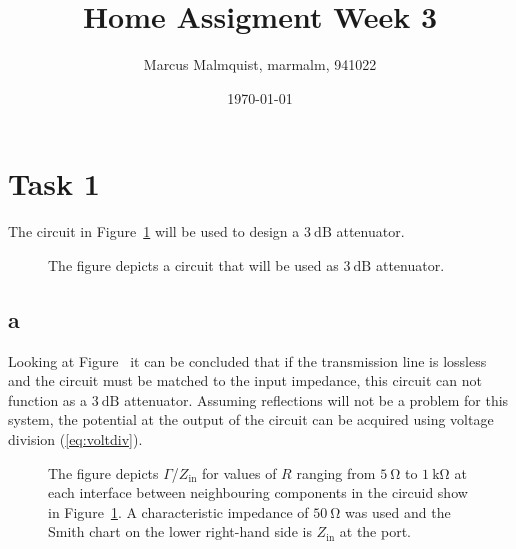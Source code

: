 \documentclass{article}
\title{Home Assigment Week 3}
\author{Marcus Malmquist, marmalm, 941022}
\date{\today}
\begin{document}
\maketitle

\section{Task 1}\label{sec:1}
The circuit in Figure~\ref{fig:circ} will be used to design a $\SI{3}{\deci\bel}$ attenuator.
\begin{figure}
  \centering
  \noindent\makebox[\textwidth]{\scalebox{0.9}{}}
  \caption{The figure depicts a circuit that will be used as $\SI{3}{\deci\bel}$ attenuator.}
  \label{fig:circ}
\end{figure}

\subsection{a}\label{sec:1a}
Looking at Figure~\label{fig:smith} it can be concluded that if the transmission line is lossless and the circuit must be matched to the input impedance, this circuit can not function as a $\SI{3}{\deci\bel}$ attenuator. Assuming reflections will not be a problem for this system, the potential at the output of the circuit can be acquired using voltage division (\ref{eq:voltdiv}).
\begin{figure}
  \centering
  \noindent{}
  \caption{The figure depicts $\Gamma$/$Z_\text{in}$ for values of $R$ ranging from $\SI{5}{\ohm}$ to $\SI{1}{\kilo\ohm}$ at each interface between neighbouring components in the circuid show in Figure~\ref{fig:circ}. A characteristic impedance of $\SI{50}{\ohm}$ was used and the Smith chart on the lower right-hand side is $Z_\text{in}$ at the port.}
  \label{fig:smith}
\end{figure}
\end{document}
